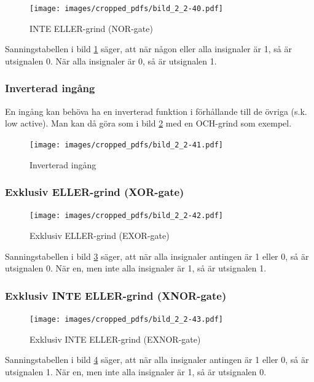 \begin{figure}
\texttt{[image: images/cropped\_pdfs/bild\_2\_2-40.pdf]}
\caption{INTE ELLER-grind (NOR-gate)}
\label{fig:BildII2-40}
\end{figure}

Sanningstabellen i bild \ref{fig:BildII2-40} säger, att när någon eller alla
insignaler är 1, så är utsignalen 0.
När alla insignaler är 0, så är utsignalen 1.

\subsubsection{Inverterad ingång}

En ingång kan behöva ha en inverterad funktion i förhållande till de övriga
(s.k. low active).
Man kan då göra som i bild \ref{fig:BildII2-41} med en OCH-grind som exempel.

\begin{figure}
\texttt{[image: images/cropped\_pdfs/bild\_2\_2-41.pdf]}
\caption{Inverterad ingång}
\label{fig:BildII2-41}
\end{figure}

\subsubsection{Exklusiv ELLER-grind (XOR-gate)}

\begin{figure}
\texttt{[image: images/cropped\_pdfs/bild\_2\_2-42.pdf]}
\caption{Exklusiv ELLER-grind (EXOR-gate)}
\label{fig:BildII2-42}
\end{figure}

Sanningstabellen i bild \ref{fig:BildII2-42} säger, att när alla insignaler
antingen är 1 eller 0, så är utsignalen 0.
När en, men inte alla insignaler är 1, så är utsignalen 1.

\subsubsection{Exklusiv INTE ELLER-grind (XNOR-gate)}

\begin{figure}
\texttt{[image: images/cropped\_pdfs/bild\_2\_2-43.pdf]}
\caption{Exklusiv INTE ELLER-grind (EXNOR-gate)}
\label{fig:BildII2-43}
\end{figure}

Sanningstabellen i bild \ref{fig:BildII2-43} säger, att när alla insignaler
antingen är 1 eller 0, så är utsignalen 1.
När en, men inte alla insignaler är 1, så är utsignalen 0.

